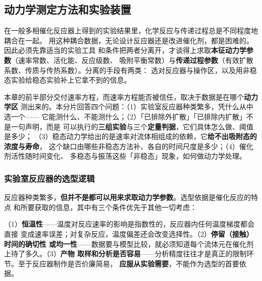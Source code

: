 
\subsection{动力学测定方法和实验装置}
\label{sec:ch10-measure}

在一般多相催化反应器上得到的实验结果里，化学反应与传递过程总是不同程度地耦合在一起。
用这种耦合数据，无论设计反应器还是改进催化剂，都是困难的。因此必须先靠适当的实验工具
和条件把两者分离开，才谈得上求取\textbf{本征动力学参数}（速率常数、活化能、反应级数、
吸附平衡常数）与\textbf{传递过程参数}（有效扩散系数、传质与传热系数）。分离的手段有两类：
选对反应器与操作区，以及用非稳态实验给稳态实验补上它拿不到的信息。

\begin{probout}
本章的前半部分交付速率方程，而速率方程能否被信任，取决于数据是在哪个\textbf{动力学区}
测出来的。本分片回答四个问题：（1）实验室反应器种类繁多，凭什么从中选一个——
它能测什么、不能测什么；（2）「已排除外扩散」「已排除内扩散」不是一句声明，而是
可以执行的\textbf{三组实验}与三个\textbf{定量判据}，它们具体怎么做、阈值是多少；
（3）稳态动力学给出的是速率对流体相组成的依赖，它\textbf{给不出吸附态的浓度与寿命}，
这个缺口由哪些非稳态方法补、各自的时间尺度是多少；（4）催化剂活性随时间变化、
多稳态与振荡这些「非稳态」现象，如何做动力学处理。
\end{probout}

\subsubsection{实验室反应器的选型逻辑}

反应器种类繁多，\textbf{但并不是都可以用来求取动力学参数}。选型依据是催化反应的特点
和所要获取的信息，其中有三个条件优先于其他一切考虑：

\begin{keycond}
（1）\textbf{恒温性}——温度对反应速率的影响是指数性的，反应器内任何温度梯度都会直接
变成速率误差；对复杂反应，温度偏差还会改变选择性。（2）\textbf{停留（接触）时间的确切性
或均一性}——数据要与模型比较，就必须知道每个流体元在催化剂上待了多久。（3）\textbf{产物
取样和分析是否容易}——分析精度往往才是真正的限制环节。至于反应器制作是否价廉简易，
\textbf{应服从实验需要}，不能作为选型的首要依据。
\end{keycond}


